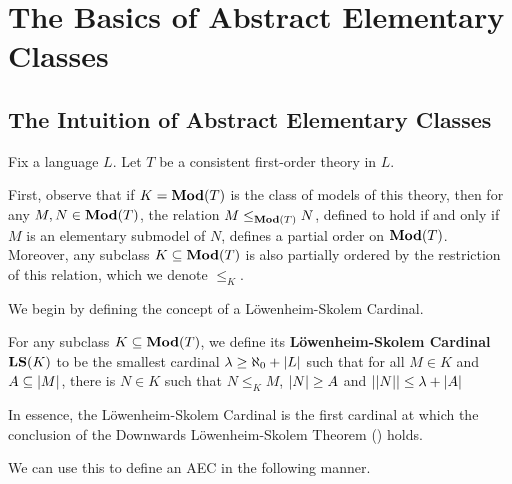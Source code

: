 \section{The Basics of Abstract Elementary Classes}

\subsection{The Intuition of Abstract Elementary Classes}

Fix a language $L$. Let $T$ be a consistent first-order theory in $L$.

First, observe that if $K = \mathbf{Mod}(T)$ is the class of models of this theory, then for any $M, N \in \mathbf{Mod}(T)$, the relation $M \leq_{\mathbf{Mod}(T)} N$, defined to hold if and only if $M$ is an elementary submodel of $N$, defines a partial order on $\mathbf{Mod}(T)$. Moreover, any subclass $K \subseteq \mathbf{Mod}(T)$ is also partially ordered by the restriction of this relation, which we denote $\leq_K$.

We begin by defining the concept of a Löwenheim-Skolem Cardinal.

\begin{boxdefinition}
    For any subclass $K \subseteq \mathbf{Mod}(T)$, we define its \textbf{Löwenheim-Skolem Cardinal $\mathbf{LS}(K)$} to be the smallest cardinal $\lambda \geq \aleph_0 + \left\lvert L \right\rvert$ such that for all $M \in K$ and $A \subseteq \left\lvert M \right\rvert$, there is $N \in K$ such that $N \leq_K M$, $\left\lvert N \right\rvert \geq A$ and $\left\lvert \left\lvert N \right\rvert \right\rvert \leq \lambda + \left\lvert A \right\rvert$
\end{boxdefinition}

In essence, the Löwenheim-Skolem Cardinal is the first cardinal at which the conclusion of the Downwards Löwenheim-Skolem Theorem () holds.

We can use this to define an AEC in the following manner.

